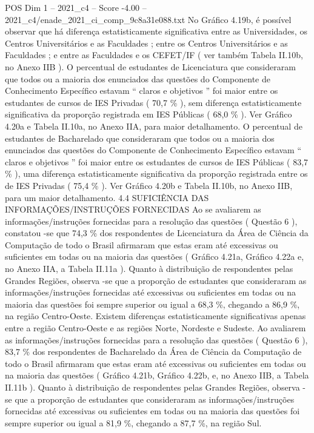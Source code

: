 \begin{textsample}{POS Dim 1 – 2021\_c4 – Score -4.00 – 2021\_c4/enade\_2021\_ci\_comp\_9c8a31e088.txt}
No Gráfico 4.19b, é possível observar que há diferença estatisticamente significativa entre as Universidades, os Centros Universitários e as Faculdades ; entre os Centros Universitários e as Faculdades ; e entre as Faculdades e os CEFET/IF ( ver também Tabela II.10b, no Anexo IIB ).
O percentual de estudantes de Licenciatura que consideraram que todos ou a maioria dos enunciados das questões do Componente de Conhecimento Específico estavam “ claros e objetivos ” foi maior entre os estudantes de cursos de IES Privadas ( 70,7 \% ), sem diferença estatisticamente significativa da proporção registrada em IES Públicas ( 68,0 \% ).
Ver Gráfico 4.20a e Tabela II.10a, no Anexo IIA, para maior detalhamento.
O percentual de estudantes de Bacharelado que consideraram que todos ou a maioria dos enunciados das questões do Componente de Conhecimento Específico estavam “ claros e objetivos ” foi maior entre os estudantes de cursos de IES Públicas ( 83,7 \% ), uma diferença estatisticamente significativa da proporção registrada entre os de IES Privadas ( 75,4 \% ).
Ver Gráfico 4.20b e Tabela II.10b, no Anexo IIB, para um maior detalhamento. 4.4 SUFICIÊNCIA DAS INFORMAÇÕES/INSTRUÇÕES FORNECIDAS Ao se avaliarem as informações/instruções fornecidas para a resolução das questões ( Questão 6 ), constatou -se que 74,3 \% dos respondentes de Licenciatura da Área de Ciência da Computação de todo o Brasil afirmaram que estas eram até excessivas ou suficientes em todas ou na maioria das questões ( Gráfico 4.21a, Gráfico 4.22a e, no Anexo IIA, a Tabela II.11a ).
Quanto à distribuição de respondentes pelas Grandes Regiões, observa -se que a proporção de estudantes que consideraram as informações/instruções fornecidas até excessivas ou suficientes em todas ou na maioria das questões foi sempre superior ou igual a 68,3 \%, chegando a 86,9 \%, na região Centro-Oeste.
Existem diferenças estatisticamente significativas apenas entre a região Centro-Oeste e as regiões Norte, Nordeste e Sudeste.
Ao avaliarem as informações/instruções fornecidas para a resolução das questões ( Questão 6 ), 83,7 \% dos respondentes de Bacharelado da Área de Ciência da Computação de todo o Brasil afirmaram que estas eram até excessivas ou suficientes em todas ou na maioria das questões ( Gráfico 4.21b, Gráfico 4.22b, e, no Anexo IIB, a Tabela II.11b ).
Quanto à distribuição de respondentes pelas Grandes Regiões, observa -se que a proporção de estudantes que consideraram as informações/instruções fornecidas até excessivas ou suficientes em todas ou na maioria das questões foi sempre superior ou igual a 81,9 \%, chegando a 87,7 \%, na região Sul.

\end{textsample}
